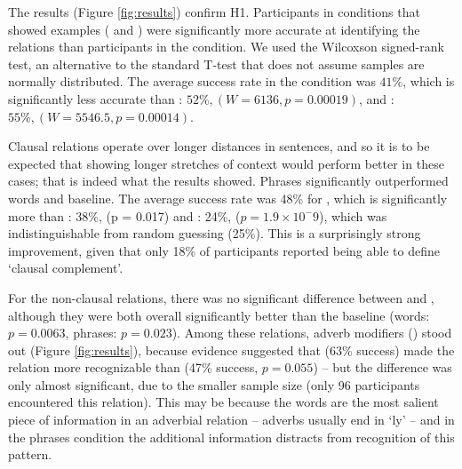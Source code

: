 The results (Figure \ref{fig:results}) confirm H1. Participants in conditions that showed examples ( and ) were significantly more accurate at identifying the relations than participants in the  condition. We used the Wilcoxson signed-rank test, an alternative to the standard T-test that does not assume samples are normally distributed. The average success rate in the  condition was $41\%$, which is significantly less accurate than : $52\%, (W = 6136, p = 0.00019)$, and : $55\%, (W = 5546.5, p = 0.00014)$.


Clausal relations operate over longer distances in sentences, and so it is to be expected that showing longer stretches of context would perform better in these cases; that is indeed what the results showed.
Phrases significantly outperformed words and baseline. The average success rate was 48\% for , which is significantly more than : 38\%, (p = 0.017) and : 24\%, ($p= 1.9 \times 10^-9$), which was indistinguishable from random guessing (25\%). This is a surprisingly strong improvement, given that only 18\% of participants reported being able to define  `clausal complement'.

For the non-clausal relations, there was no significant difference between  and , although they were both overall significantly better than the baseline (words: $p=0.0063$, phrases: $p=0.023$). Among these relations, adverb modifiers () stood out (Figure \ref{fig:results}), because evidence suggested that  (63\% success) made the relation more recognizable than  (47\% success, $p = 0.055$) -- but the difference was only almost significant, due to the smaller sample size (only 96 participants encountered this relation). This may be because the words are the most salient piece of information in an adverbial relation -- adverbs usually end in `ly' -- and in the phrases condition the additional information distracts from recognition of this pattern.

